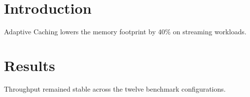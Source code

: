 \section{Introduction}
Adaptive Caching lowers the memory footprint by 40\% on streaming workloads.
\section{Results}
Throughput remained stable across the twelve benchmark configurations.
